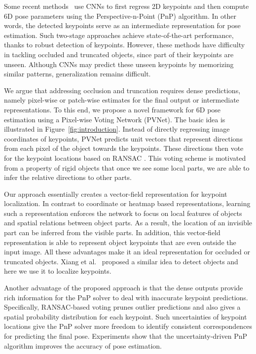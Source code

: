 \documentclass[10pt,twocolumn,letterpaper]{article}
\begin{document}
Some recent methods~\cite{pavlakos20176,rad2017bb8,tekin2018real} use CNNs to first regress 2D keypoints and then compute 6D pose parameters using the Perspective-n-Point (PnP) algorithm. In other words, the detected keypoints serve as an intermediate representation for pose estimation. Such two-stage approaches achieve state-of-the-art performance, thanks to robust detection of keypoints. However, these methods have difficulty in tackling occluded and truncated objects, since part of their keypoints are unseen. Although CNNs may predict these unseen keypoints by memorizing similar patterns, generalization remains difficult. 




We argue that addressing occlusion and truncation requires dense predictions, namely pixel-wise or patch-wise estimates for the final output or intermediate representations. To this end, we propose a novel framework for 6D pose estimation using a Pixel-wise Voting Network (PVNet). The basic idea is illustrated in Figure~\ref{fig:introduction}. Instead of directly regressing image coordinates of keypoints, PVNet predicts unit vectors that represent directions from each pixel of the object towards the keypoints. These directions then vote for the keypoint locations based on RANSAC \cite{fischler1981random}. This voting scheme is motivated from a property of rigid objects that once we see some local parts, we are able to infer the relative directions to other parts. 

Our approach essentially creates a vector-field representation for keypoint localization. In contrast to coordinate or heatmap based representations, learning such a representation enforces the network to focus on local features of objects and spatial relations between object parts. As a result, the location of an invisible part can be inferred from the visible parts. In addition, this vector-field representation is able to represent object keypoints that are even outside the input image. All these advantages make it an ideal representation for occluded or truncated objects. Xiang et al.~\cite{xiang2017posecnn} proposed a similar idea to detect objects and here we use it to localize keypoints. 

Another advantage of the proposed approach is that the dense outputs provide rich information for the PnP solver to deal with inaccurate keypoint predictions. Specifically, RANSAC-based voting prunes outlier predictions and also gives a spatial probability distribution for each keypoint. Such uncertainties of keypoint locations give the PnP solver more freedom to identify consistent correspondences for predicting the final pose. Experiments show that the uncertainty-driven PnP algorithm improves the accuracy of pose estimation.
\end{document}
